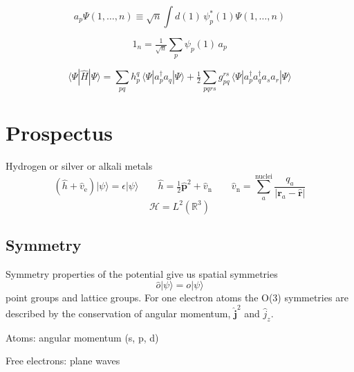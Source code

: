 \begin{equation}
    a_p
    \Psi(1, \ldots, n)
    \equiv
    \sqrt{n}
    \int
    d(1)\,
    \psi_p^*(1)
    \Psi(1, \ldots, n)
\end{equation}

\begin{equation}
    1_n
    =
    \tfrac{1}{\sqrt{n}}
    \sum_p
    \psi_p(1)\,
    a_p
\end{equation}

\begin{equation}
    \langle\Psi|\hat{H}|\Psi\rangle
    =
    \sum_{pq}
    h_p^q\,
    \langle\Psi|a_p^\dagger a_q|\Psi\rangle
    +
    \tfrac{1}{2}
    \sum_{pqrs}
    g_{pq}^{rs}\,
    \langle\Psi|a_p^\dagger a_q^\dagger a_s a_r|\Psi\rangle
\end{equation}


\section{Prospectus}



\newpage
Hydrogen or silver or alkali metals
\begin{equation}
    (\hat{h} + \hat{v}_\mathrm{e})
    |\psi\rangle
    =
    \epsilon
    |\psi\rangle
    \qquad
    \hat{h}
    =
    \tfrac{1}{2}
    \hat{\mathbf{p}}^2
    +
    \hat{v}_\mathrm{n}
    \qquad
    \hat{v}_\mathrm{n}
    =
    \sum_a^{\mathrm{nuclei}}
    \frac{q_a}{|\mathbf{r}_a-\hat{\mathbf{r}}|}
\end{equation}
\begin{equation}
    \mathcal{H}
    =
    L^2(\mathbb{R}^3)
\end{equation}

\subsection{Symmetry}

Symmetry properties of the potential give us spatial symmetries
\begin{equation}
    \hat{o}
    |\psi\rangle
    =
    o
    |\psi\rangle
\end{equation}
point groups and lattice groups.
For one electron atoms the O(3) symmetries are described by the conservation of
angular momentum, \(\hat{\mathbf{j}}^2\) and \(\hat{j}_z\).

\noindent
Atoms: angular momentum (s, p, d)

\noindent
Free electrons: plane waves

